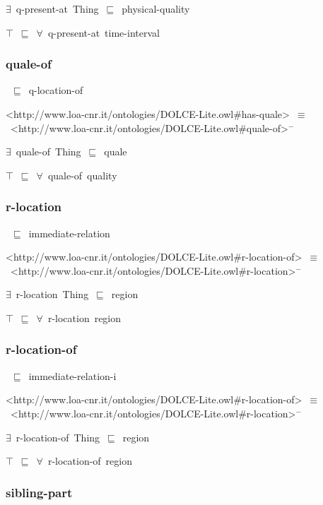 \documentclass{article}
\begin{document}
\ensuremath{\exists}~q-present-at~Thing~\ensuremath{\sqsubseteq}~physical-quality

\ensuremath{\top}~\ensuremath{\sqsubseteq}~\ensuremath{\forall}~q-present-at~time-interval

\subsubsection*{quale-of}

~\ensuremath{\sqsubseteq}~q-location-of

<http://www.loa-cnr.it/ontologies/DOLCE-Lite.owl#has-quale>~\ensuremath{\equiv}~<http://www.loa-cnr.it/ontologies/DOLCE-Lite.owl#quale-of>\ensuremath{^-}

\ensuremath{\exists}~quale-of~Thing~\ensuremath{\sqsubseteq}~quale

\ensuremath{\top}~\ensuremath{\sqsubseteq}~\ensuremath{\forall}~quale-of~quality

\subsubsection*{r-location}

~\ensuremath{\sqsubseteq}~immediate-relation

<http://www.loa-cnr.it/ontologies/DOLCE-Lite.owl#r-location-of>~\ensuremath{\equiv}~<http://www.loa-cnr.it/ontologies/DOLCE-Lite.owl#r-location>\ensuremath{^-}

\ensuremath{\exists}~r-location~Thing~\ensuremath{\sqsubseteq}~region

\ensuremath{\top}~\ensuremath{\sqsubseteq}~\ensuremath{\forall}~r-location~region

\subsubsection*{r-location-of}

~\ensuremath{\sqsubseteq}~immediate-relation-i

<http://www.loa-cnr.it/ontologies/DOLCE-Lite.owl#r-location-of>~\ensuremath{\equiv}~<http://www.loa-cnr.it/ontologies/DOLCE-Lite.owl#r-location>\ensuremath{^-}

\ensuremath{\exists}~r-location-of~Thing~\ensuremath{\sqsubseteq}~region

\ensuremath{\top}~\ensuremath{\sqsubseteq}~\ensuremath{\forall}~r-location-of~region

\subsubsection*{sibling-part}
\end{document}

